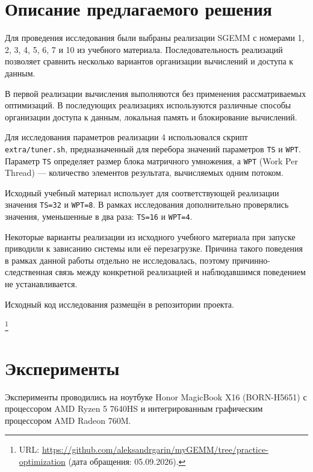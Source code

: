 \documentclass[a4paper]{article}
\begin{document}
\section{Описание предлагаемого решения}

Для проведения исследования были выбраны реализации SGEMM с номерами 1, 2, 3, 4, 5, 6, 7 и 10 из учебного материала. Последовательность реализаций позволяет сравнить несколько вариантов организации вычислений и доступа к данным.

В первой реализации вычисления выполняются без применения рассматриваемых оптимизаций. В последующих реализациях используются различные способы организации доступа к данным, локальная память и блокирование вычислений.

Для исследования параметров реализации 4 использовался скрипт \texttt{extra/tuner.sh}, предназначенный для перебора значений параметров \texttt{TS} и \texttt{WPT}. Параметр \texttt{TS} определяет размер блока матричного умножения, а \texttt{WPT} (Work Per Thread) --- количество элементов результата, вычисляемых одним потоком.

Исходный учебный материал использует для соответствующей реализации значения \texttt{TS=32} и \texttt{WPT=8}. В рамках исследования дополнительно проверялись значения, уменьшенные в два раза: \texttt{TS=16} и \texttt{WPT=4}.

Некоторые варианты реализации из исходного учебного материала при запуске приводили к зависанию системы или её перезагрузке. Причина такого поведения в рамках данной работы отдельно не исследовалась, поэтому причинно-следственная связь между конкретной реализацией и наблюдавшимся поведением не устанавливается.

Исходный код исследования размещён в репозитории проекта.

\footnote{URL: \url{https://github.com/aleksandrgarin/myGEMM/tree/practice-optimization} (дата обращения: 05.09.2026).}

\section{Эксперименты}

Эксперименты проводились на ноутбуке Honor MagicBook X16 (BORN-H5651) с процессором AMD Ryzen 5 7640HS и интегрированным графическим процессором AMD Radeon 760M.
\end{document}
